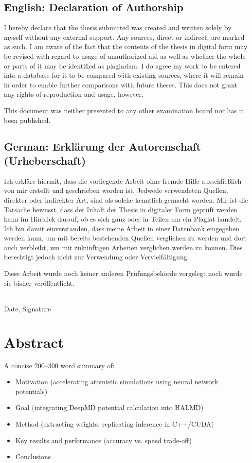 \documentclass[a4paper,11pt,oneside]{article}
\begin{document}
\subsection*{English: Declaration of Authorship}

I hereby declare that the thesis submitted was created and written
solely by myself without any external support. Any sources, direct
or indirect, are marked as such. I am aware of the fact that the
contents of the thesis in digital form may be revised with regard to
usage of unauthorized aid as well as whether the whole or parts of
it may be identified as plagiarism. I do agree my work to be entered
into a database for it to be compared with existing sources, where
it will remain in order to enable further comparisons with future
theses. This does not grant any rights of reproduction and usage,
however.

This document was neither presented to any other examination board
nor has it been published.

\subsection*{German: Erklärung der Autorenschaft (Urheberschaft)}

Ich erkläre hiermit, dass die vorliegende Arbeit ohne fremde Hilfe
ausschließlich von mir erstellt und geschrieben worden ist. Jedwede
verwendeten Quellen, direkter oder indirekter Art, sind als solche
kenntlich gemacht worden. Mir ist die Tatsache bewusst, dass der
Inhalt der Thesis in digitaler Form geprüft werden kann im Hinblick
darauf, ob es sich ganz oder in Teilen um ein Plagiat handelt. Ich
bin damit einverstanden, dass meine Arbeit in einer Datenbank
eingegeben werden kann, um mit bereits bestehenden Quellen
verglichen zu werden und dort auch verbleibt, um mit zukünftigen
Arbeiten verglichen werden zu können. Dies berechtigt jedoch nicht
zur Verwendung oder Vervielfältigung.

Diese Arbeit wurde noch keiner anderen Prüfungsbehörde vorgelegt
noch wurde sie bisher veröffentlicht.

\vspace{20mm}

\dotfill\\
Date, Signature

\newpage

\section*{Abstract}
A concise 200–300 word summary of:
\begin{itemize}
  \item Motivation (accelerating atomistic simulations using neural network potentials)
  \item Goal (integrating DeepMD potential calculation into HALMD)
  \item Method (extracting weights, replicating inference in C++/CUDA)
  \item Key results and performance (accuracy vs. speed trade-off)
  \item Conclusions
\end{itemize}
\end{document}
